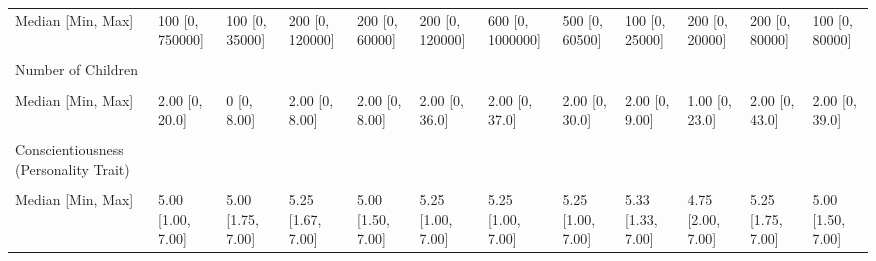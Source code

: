 \documentclass[
  single column]{article}
\begin{document}
\begin{landscape}
\begin{longtable}[t]{llllllllllll}
Median [Min, Max] & 100 [0, 750000] & 100 [0, 35000] & 200 [0, 120000] & 200 [0, 60000] & 200 [0, 120000] & 600 [0, 1000000] & 500 [0, 60500] & 100 [0, 25000] & 200 [0, 20000] & 200 [0, 80000] & 100 [0, 80000]\\
\cellcolor{gray!10}{Missing} & \cellcolor{gray!10}{77 (0.4\%)} & \cellcolor{gray!10}{13 (2.0\%)} & \cellcolor{gray!10}{65 (4.8\%)} & \cellcolor{gray!10}{12 (4.4\%)} & \cellcolor{gray!10}{92 (4.6\%)} & \cellcolor{gray!10}{151 (4.1\%)} & \cellcolor{gray!10}{47 (4.3\%)} & \cellcolor{gray!10}{7 (5.1\%)} & \cellcolor{gray!10}{5 (5.7\%)} & \cellcolor{gray!10}{38 (6.6\%)} & \cellcolor{gray!10}{42 (5.6\%)}\\
Number of Children &  &  &  &  &  &  &  &  &  &  & \\
\addlinespace
\cellcolor{gray!10}{Mean (SD)} & \cellcolor{gray!10}{1.52 (1.39)} & \cellcolor{gray!10}{1.20 (1.58)} & \cellcolor{gray!10}{2.13 (1.30)} & \cellcolor{gray!10}{1.46 (1.35)} & \cellcolor{gray!10}{2.12 (1.85)} & \cellcolor{gray!10}{1.98 (1.76)} & \cellcolor{gray!10}{2.32 (1.92)} & \cellcolor{gray!10}{1.44 (1.47)} & \cellcolor{gray!10}{1.72 (2.67)} & \cellcolor{gray!10}{2.22 (2.17)} & \cellcolor{gray!10}{1.78 (2.15)}\\
Median [Min, Max] & 2.00 [0, 20.0] & 0 [0, 8.00] & 2.00 [0, 8.00] & 2.00 [0, 8.00] & 2.00 [0, 36.0] & 2.00 [0, 37.0] & 2.00 [0, 30.0] & 2.00 [0, 9.00] & 1.00 [0, 23.0] & 2.00 [0, 43.0] & 2.00 [0, 39.0]\\
\cellcolor{gray!10}{Missing} & \cellcolor{gray!10}{18 (0.1\%)} & \cellcolor{gray!10}{29 (4.4\%)} & \cellcolor{gray!10}{0 (0\%)} & \cellcolor{gray!10}{0 (0\%)} & \cellcolor{gray!10}{3 (0.1\%)} & \cellcolor{gray!10}{2 (0.1\%)} & \cellcolor{gray!10}{1 (0.1\%)} & \cellcolor{gray!10}{0 (0\%)} & \cellcolor{gray!10}{0 (0\%)} & \cellcolor{gray!10}{0 (0\%)} & \cellcolor{gray!10}{1 \vphantom{1} (0.1\%)}\\
Conscientiousness (Personality Trait) &  &  &  &  &  &  &  &  &  &  & \\
\cellcolor{gray!10}{Mean (SD)} & \cellcolor{gray!10}{5.01 (1.11)} & \cellcolor{gray!10}{5.02 (1.08)} & \cellcolor{gray!10}{5.21 (1.01)} & \cellcolor{gray!10}{5.06 (1.11)} & \cellcolor{gray!10}{5.22 (1.07)} & \cellcolor{gray!10}{5.09 (1.04)} & \cellcolor{gray!10}{5.09 (1.04)} & \cellcolor{gray!10}{5.25 (1.02)} & \cellcolor{gray!10}{4.91 (1.16)} & \cellcolor{gray!10}{5.15 (1.01)} & \cellcolor{gray!10}{4.91 (1.17)}\\
\addlinespace
Median [Min, Max] & 5.00 [1.00, 7.00] & 5.00 [1.75, 7.00] & 5.25 [1.67, 7.00] & 5.00 [1.50, 7.00] & 5.25 [1.00, 7.00] & 5.25 [1.00, 7.00] & 5.25 [1.00, 7.00] & 5.33 [1.33, 7.00] & 4.75 [2.00, 7.00] & 5.25 [1.75, 7.00] & 5.00 [1.50, 7.00]\\

\end{longtable}
\end{landscape}
\end{document}
